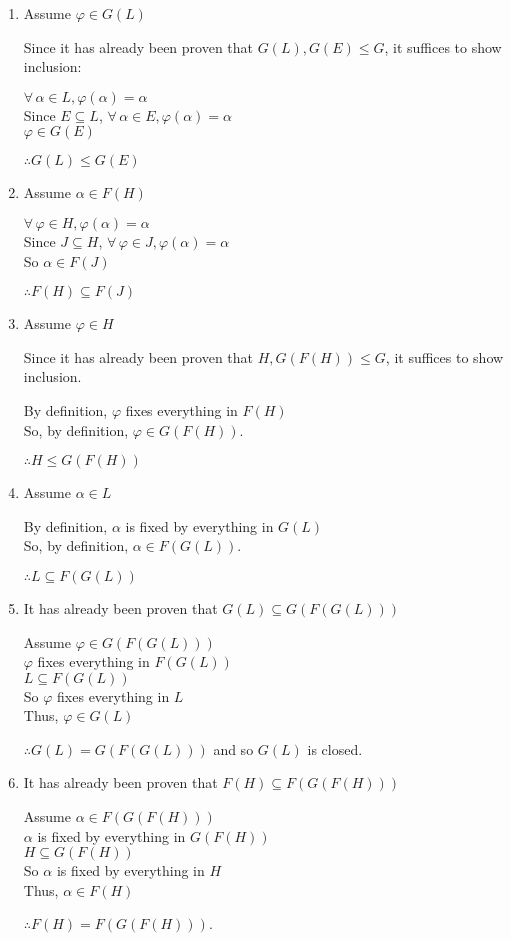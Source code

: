 \documentclass[letterpaper,12pt,fleqn]{article}
\renewcommand{\a}{\alpha}
\newcommand{\vp}{\varphi}
\begin{document}
\begin{theproof}
  \listbreak
  \begin{enumerate}
  \item Assume $\vp\in G(L)$

    Since it has already been proven that $G(L),G(E)\le G$, it suffices to show inclusion:

    $\forall\,\a\in L,\vp(\a)=\a$ \\
    Since $E\subseteq L$, $\forall\,\a\in E,\vp(\a)=\a$ \\
    $\vp\in G(E)$
    
    $\therefore G(L)\le G(E)$

  \item Assume $\a\in F(H)$

    $\forall\,\vp\in H,\vp(\a)=\a$ \\
    Since $J\subseteq H$, $\forall\,\vp\in J,\vp(\a)=\a$ \\
    So $\a\in F(J)$

    $\therefore F(H)\subseteq F(J)$

  \item Assume $\vp\in H$

    Since it has already been proven that $H,G(F(H))\le G$, it suffices to show inclusion.
    
    By definition, $\vp$ fixes everything in $F(H)$ \\
    So, by definition, $\vp\in G(F(H))$.

    $\therefore H\le G(F(H))$

  \item Assume $\a\in L$

    By definition, $\a$ is fixed by everything in $G(L)$ \\
    So, by definition, $\a\in F(G(L))$.

    $\therefore L\subseteq F(G(L))$

  \item It has already been proven that $G(L)\subseteq G(F(G(L)))$

    Assume $\vp\in G(F(G(L)))$ \\
    $\vp$ fixes everything in $F(G(L))$ \\
    $L\subseteq F(G(L))$ \\
    So $\vp$ fixes everything in $L$ \\
    Thus, $\vp\in G(L)$
    
    $\therefore G(L)=G(F(G(L)))$ and so $G(L)$ is closed.

  \item It has already been proven that $F(H)\subseteq F(G(F(H)))$

    Assume $\a\in F(G(F(H)))$ \\
    $\a$ is fixed by everything in $G(F(H))$ \\
    $H\subseteq G(F(H))$ \\
    So $\a$ is fixed by everything in $H$ \\
    Thus, $\a\in F(H)$

    $\therefore F(H)=F(G(F(H)))$.
  \end{enumerate}
\end{theproof}
\end{document}
